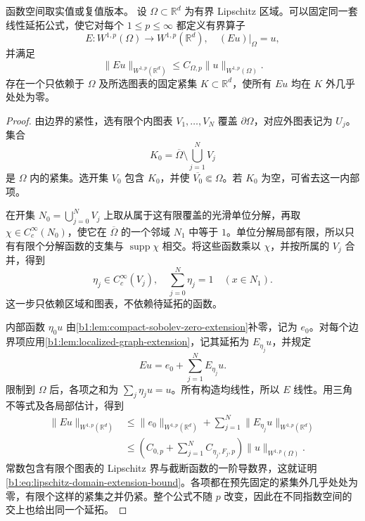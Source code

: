 \begin{theorem}\label{b1:thm:lipschitz-domain-extension}
函数空间取实值或复值版本。
设 \(\Omega\subset\mathbb R^d\) 为有界 Lipschitz 区域。可以固定同一套线性延拓公式，使它对每个 \(1\le p\le\infty\) 都定义有界算子
\[
 E:W^{1,p}(\Omega)\longrightarrow W^{1,p}(\mathbb R^d),
 \quad (Eu)|_\Omega=u,
\]
并满足
\begin{equation}\label{b1:eq:lipschitz-domain-extension-bound}
 \|Eu\|_{W^{1,p}(\mathbb R^d)}
 \le C_{\Omega,p}\|u\|_{W^{1,p}(\Omega)}.
\end{equation}
存在一个只依赖于 \(\Omega\) 及所选图表的固定紧集 \(K\subset\mathbb R^d\)，使所有 \(Eu\) 均在 \(K\) 外几乎处处为零。
\end{theorem}
\begin{proof}
由边界的紧性，选有限个内图表 \(V_1,\ldots,V_N\) 覆盖 \(\partial\Omega\)，对应外图表记为 \(U_j\)。集合
\[
 K_0=\overline\Omega\setminus\bigcup_{j=1}^N V_j
\]
是 \(\Omega\) 内的紧集。选开集 \(V_0\) 包含 \(K_0\)，并使 \(\overline{V_0}\Subset\Omega\)。若 \(K_0\) 为空，可省去这一内部项。

在开集 \(N_0=\bigcup_{j=0}^N V_j\) 上取从属于这有限覆盖的光滑单位分解，再取 \(\chi\in C_c^\infty(N_0)\)，使它在 \(\overline\Omega\) 的一个邻域 \(N_1\) 中等于 \(1\)。单位分解局部有限，所以只有有限个分解函数的支集与 \(\operatorname{supp}\chi\) 相交。将这些函数乘以 \(\chi\)，并按所属的 \(V_j\) 合并，得到
\[
 \eta_j\in C_c^\infty(V_j),\quad
 \sum_{j=0}^N\eta_j=1
 \quad(x\in N_1).
\]
这一步只依赖区域和图表，不依赖待延拓的函数。

内部函数 \(\eta_0u\) 由\cref{b1:lem:compact-sobolev-zero-extension}补零，记为 \(e_0\)。对每个边界项应用\cref{b1:lem:localized-graph-extension}，记其延拓为 \(E_{\eta_j}u\)，并规定
\[
 Eu=e_0+\sum_{j=1}^N E_{\eta_j}u.
\]
限制到 \(\Omega\) 后，各项之和为 \(\sum_j\eta_j u=u\)。所有构造均线性，所以 \(E\) 线性。用三角不等式及各局部估计，得到
\[
 \begin{split}
 \|Eu\|_{W^{1,p}(\mathbb R^d)}
 &\le\|e_0\|_{W^{1,p}(\mathbb R^d)}
       +\sum_{j=1}^N\|E_{\eta_j}u\|_{W^{1,p}(\mathbb R^d)}\\
 &\le\left(C_{0,p}+\sum_{j=1}^N C_{\eta_j,F_j,p}\right)
       \|u\|_{W^{1,p}(\Omega)}.
 \end{split}
\]
常数包含有限个图表的 Lipschitz 界与截断函数的一阶导数界，这就证明\eqref{b1:eq:lipschitz-domain-extension-bound}。各项都在预先固定的紧集外几乎处处为零，有限个这样的紧集之并仍紧。整个公式不随 \(p\) 改变，因此在不同指数空间的交上也给出同一个延拓。
\end{proof}

